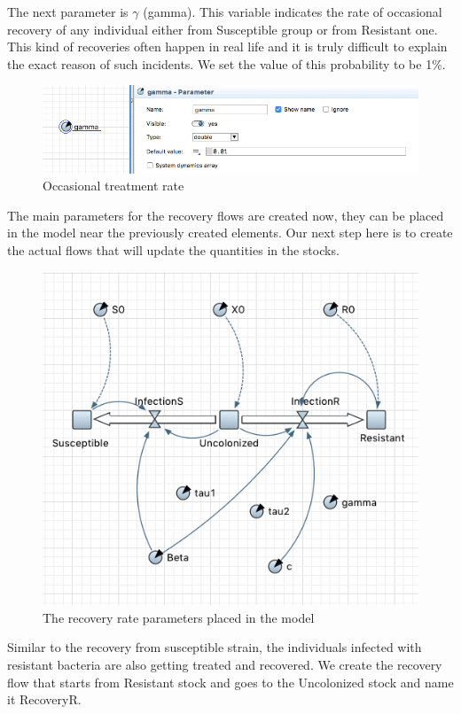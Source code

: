 The next parameter is $\gamma$ (gamma). This variable indicates the rate of occasional recovery of any individual either from Susceptible group or from Resistant one. This kind of recoveries often happen in real life and it is truly difficult to explain the exact reason of such incidents. We set the value of this probability to be 1\%.

\begin{figure}[H]
  \centering
  \includegraphics[height=0.25\textwidth]{img/screens/recovery/recovery4}
  \caption{Occasional treatment rate}
\end{figure}

The main parameters for the recovery flows are created now, they can be placed in the model near the previously created elements. Our next step here is to create the actual flows that will update the quantities in the stocks.

\begin{figure}[H]
  \centering
  \includegraphics[height=0.5\textwidth]{img/screens/recovery/recovery3}
  \caption{The recovery rate parameters placed in the model}
\end{figure}

Similar to the recovery from susceptible strain, the individuals infected with resistant bacteria are also getting treated and recovered. We create the recovery flow that starts from Resistant stock and goes to the Uncolonized stock and name it RecoveryR.

